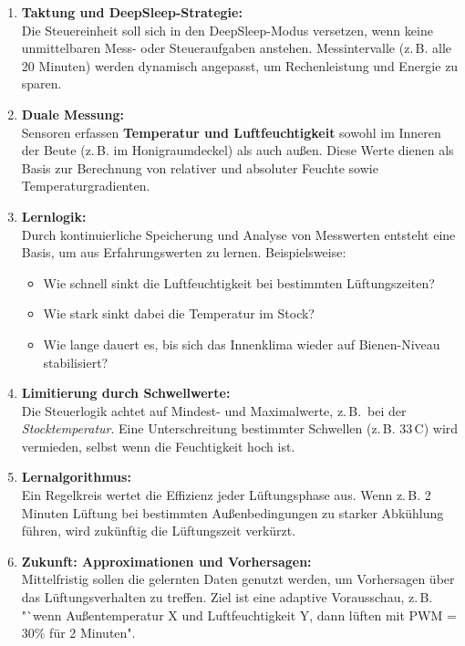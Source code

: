 \documentclass[11pt,a4paper]{article}
\begin{document}
\begin{enumerate}[label=\arabic*.]
  \item \textbf{Taktung und DeepSleep-Strategie:} \\Die Steuereinheit soll sich in den DeepSleep-Modus versetzen, wenn keine unmittelbaren Mess- oder Steueraufgaben anstehen. Messintervalle (z.\,B. alle 20 Minuten) werden dynamisch angepasst, um Rechenleistung und Energie zu sparen.

  \item \textbf{Duale Messung:} \\Sensoren erfassen \textbf{Temperatur und Luftfeuchtigkeit} sowohl im Inneren der Beute (z.\,B. im Honigraumdeckel) als auch au\ss en. Diese Werte dienen als Basis zur Berechnung von relativer und absoluter Feuchte sowie Temperaturgradienten.

  \item \textbf{Lernlogik:} \\Durch kontinuierliche Speicherung und Analyse von Messwerten entsteht eine Basis, um aus Erfahrungswerten zu lernen. Beispielsweise:
  \begin{itemize}
    \item Wie schnell sinkt die Luftfeuchtigkeit bei bestimmten L\"uftungszeiten?
    \item Wie stark sinkt dabei die Temperatur im Stock?
    \item Wie lange dauert es, bis sich das Innenklima wieder auf Bienen-Niveau stabilisiert?
  \end{itemize}

  \item \textbf{Limitierung durch Schwellwerte:} \\Die Steuerlogik achtet auf Mindest- und Maximalwerte, z.\,B.\ bei der \textit{Stocktemperatur}. Eine Unterschreitung bestimmter Schwellen (z.\,B. 33\,\textdegree C) wird vermieden, selbst wenn die Feuchtigkeit hoch ist.

  \item \textbf{Lernalgorithmus:} \\Ein Regelkreis wertet die Effizienz jeder L\"uftungsphase aus. Wenn z.\,B. 2 Minuten L\"uftung bei bestimmten Au\ss enbedingungen zu starker Abk\"uhlung f\"uhren, wird zuk\"unftig die L\"uftungszeit verk\"urzt.

  \item \textbf{Zukunft: Approximationen und Vorhersagen:} \\Mittelfristig sollen die gelernten Daten genutzt werden, um Vorhersagen \"uber das L\"uftungsverhalten zu treffen. Ziel ist eine adaptive Vorausschau, z.\,B. "`wenn Außentemperatur X und Luftfeuchtigkeit Y, dann l\"uften mit PWM = 30\% f\"ur 2 Minuten".


\end{enumerate}
\end{document}
